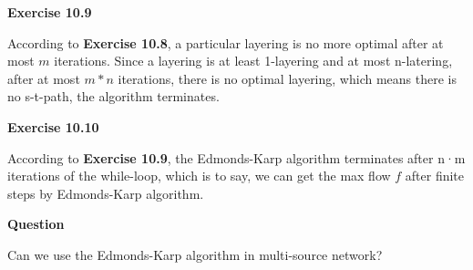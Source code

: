 \documentclass{article} %
\begin{document}
	\textbf{Exercise 10.9}\par
	According to \textbf{Exercise 10.8}, a particular layering is no more optimal after at most $m$ iterations. Since a layering is at least 1-layering and at most n-latering, after at most $m*n$ iterations, there is no optimal layering, which means there is no s-t-path, the algorithm terminates.
	
	
	\textbf{Exercise 10.10}\par
	According to \textbf{Exercise 10.9},  the Edmonds-Karp algorithm terminates after n·m iterations of the while-loop, which is to say, we can get the max flow $f$ after finite steps by Edmonds-Karp algorithm.

		\textbf{Question}\par
	Can we use the Edmonds-Karp algorithm in multi-source network?
	
\end{document}
